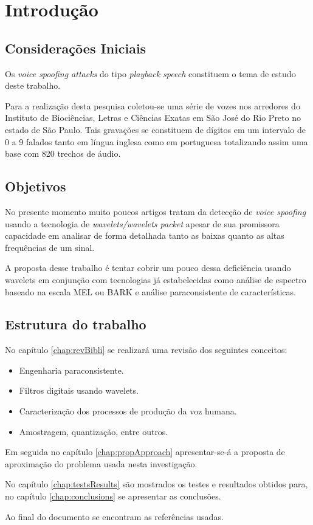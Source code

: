 \chapter{Introdução}
	\begin{myenv}{1.5}
		\section{Considerações Iniciais}
			\par Os \textit{voice spoofing attacks} do tipo \textit{playback speech} constituem o tema de estudo deste trabalho.
			\par Para a realização desta pesquisa coletou-se uma série de vozes nos arredores do Instituto de Biociências, Letras e Ciências Exatas em São José do Rio Preto no estado de São Paulo. Tais gravações se constituem de dígitos em um intervalo de 0 a 9 falados tanto em língua inglesa como em portuguesa totalizando assim uma base com 820 trechos de áudio.
						 
		\section{Objetivos}
			\par No presente momento muito poucos artigos tratam da detecção de \textit{voice spoofing} usando a tecnologia de \textit{wavelets/wavelets packet} apesar de sua promissora capacidade em analisar de forma detalhada tanto as baixas quanto as altas frequências de um sinal.
			\par A proposta desse trabalho é tentar cobrir um pouco dessa deficiência usando wavelets em conjunção com tecnologias já estabelecidas como análise de espectro baseado na escala MEL ou BARK e análise paraconsistente de características.
			
		\section{Estrutura do trabalho}
			\par No capítulo \ref{chap:revBibli} se realizará uma revisão dos seguintes conceitos:
			\begin{itemize}
				\item Engenharia paraconsistente.
				\item Filtros digitais usando wavelets.
				\item Caracterização dos processos de produção da voz humana.
				\item Amostragem, quantização, entre outros.
			\end{itemize}
			\par Em seguida no capítulo \ref{chap:propApproach} apresentar-se-á a proposta de aproximação do problema usada nesta investigação. 
			\par No capítulo \ref{chap:testsResults} são mostrados os testes e resultados obtidos para, no capítulo \ref{chap:conclusions} se apresentar as conclusões.
			\par Ao final do documento se encontram as referências usadas.
		
		
	\end{myenv}